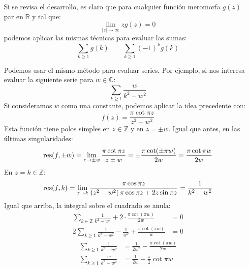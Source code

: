   Si se revisa el desarrollo,
  es claro que para cualquier función meromorfa \(g(z)\)
  par en \(\mathbb{R}\) y tal que:
  \begin{equation*}
    \lim_{\lvert z \rvert \rightarrow \infty} z g(z) = 0
  \end{equation*}
  podemos aplicar las mismas técnicas para evaluar las sumas:
  \begin{equation*}
    \sum_{k \ge 1} g(k)
    \qquad
    \sum_{k \ge 1} (-1)^k g(k)
  \end{equation*}

  Podemos usar el mismo método para evaluar series.
  Por ejemplo,
  si nos interesa evaluar
  la siguiente serie para \(w \in \mathbb{C}\):
  \begin{equation*}
    \sum_{k \ge 1} \frac{w}{k^2 - w^2}
  \end{equation*}
  Si consideramos \(w\) como una constante,
  podemos aplicar la idea precedente con:
  \begin{equation*}
    f(z)
      = \frac{\pi \cot \pi z}{z^2 - w^2}
  \end{equation*}
  Esta función tiene polos simples en \(z \in \mathbb{Z}\)
  y en \(z = \pm w\).
  Igual que antes,
  en las últimas singularidades:
  \begin{equation*}
    \operatorname{res}(f, \pm w)
      = \lim_{z \rightarrow \pm w}
	  \frac{\pi \cot \pi z}{z \pm w}
      = \pm \frac{\pi \cot (\pm \pi w)}{2 w}
      = \frac{\pi \cot \pi w}{2 w}
  \end{equation*}
  En \(z = k \in \mathbb{Z}\):
  \begin{equation*}
    \operatorname{res}(f, k)
      = \lim_{z \rightarrow k}
	  \frac{\pi \cos \pi z}
	{(z^2 - w^2) \, \pi \cos \pi z + 2 z \sin \pi z}
      = \frac{1}{k^2 - w^2}
  \end{equation*}
  Igual que arriba,
  la integral sobre el cuadrado se anula:
  \begin{align*}
    \sum_{k \in \mathbb{Z}} \frac{1}{k^2 - w^2}
      + 2 \cdot \frac{\pi \cot (\pi w)}{2 w}
      &= 0 \\
    2 \sum_{k \ge 1} \frac{1}{k^2 - w^2}
      - \frac{1}{w^2}
      + \frac{\pi \cot (\pi w)}{w}
      &= 0
  \end{align*}
  \begin{align*}
    \sum_{k \ge 1} \frac{1}{k^2 - w^2}
      &= \frac{1}{2 w^2} - \frac{\pi \cot (\pi w)}{2 w} \\
    \sum_{k \ge 1} \frac{w}{k^2 - w^2}
      &= \frac{1}{2 w} - \frac{\pi}{2} \cot \pi w
  \end{align*}

